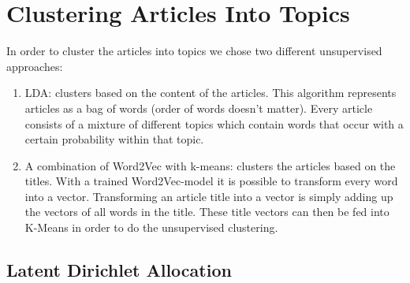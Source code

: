 \section{Clustering Articles Into Topics}
\label{sec:topic_detection}

In order to cluster the articles into topics we chose two different unsupervised approaches: 

\begin{enumerate}
\item LDA: clusters based on the content of the articles. This algorithm represents articles as a bag of words (order of words doesn't matter). Every article consists of a mixture of different topics which contain words that occur with a certain probability within that topic. 
\item A combination of Word2Vec with k-means: clusters the articles based on the titles. With a trained Word2Vec-model it is possible to transform every word into a vector. Transforming an article title into a vector is simply adding up the vectors of all words in the title. These title vectors can then be fed into K-Means in order to do the unsupervised clustering.
\end{enumerate}


\subsection{Latent Dirichlet Allocation}


